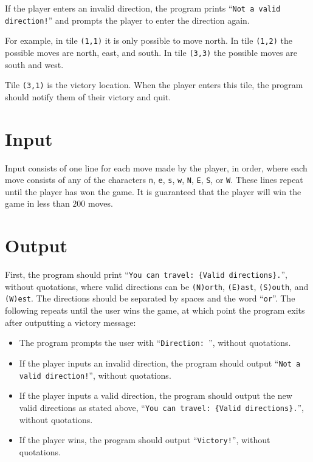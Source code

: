 If the player enters an invalid direction,
the program prints ``\texttt{Not a valid direction!}''
and prompts the player to enter the direction again.

For example, in tile \texttt{(1,1)} it is only possible to move north.
In tile \texttt{(1,2)} the possible moves are north, east, and south.
In tile \texttt{(3,3)} the possible moves are south and west.

Tile \texttt{(3,1)} is the victory location.
When the player enters this tile, the program should notify them of their victory and quit.

\section*{Input}
Input consists of one line for each move made by the player, in order,
where each move consists of any of the characters
\texttt{n}, \texttt{e}, \texttt{s}, \texttt{w}, \texttt{N}, \texttt{E}, \texttt{S}, or \texttt{W}.
These lines repeat until the player has won the game.
It is guaranteed that the player will win the game in less than $200$ moves.

\section*{Output}

First, the program should print ``\texttt{You can travel: \{Valid directions\}.}'',
without quotations, where valid directions can be
\texttt{(N)orth}, \texttt{(E)ast}, \texttt{(S)outh}, and \texttt{(W)est}.
The directions should be separated by spaces and the word ``\texttt{or}''.
The following repeats until the user wins the game,
at which point the program exits after outputting a victory message:
\begin{itemize}

    \item The program prompts the user with ``\texttt{Direction: }'', without quotations.
    \item If the player inputs an invalid direction, the program should output ``\texttt{Not a valid direction!}'', without quotations.
    \item If the player inputs a valid direction, the program should output the new valid directions as stated above, 
        ``\texttt{You can travel: \{Valid directions\}.}'', without quotations.
    \item If the player wins, the program should output ``\texttt{Victory!}'', without quotations.

\end{itemize}
